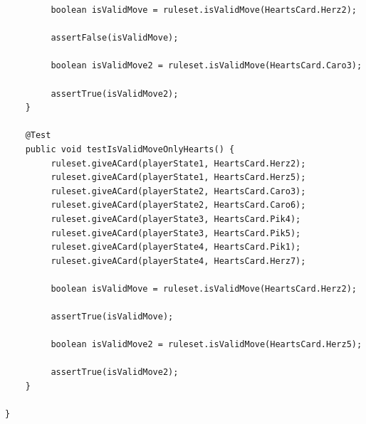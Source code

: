 \documentclass[twoside]{article}
\begin{document}
\begin{lstlisting}
	     boolean isValidMove = ruleset.isValidMove(HeartsCard.Herz2);

	     assertFalse(isValidMove);

	     boolean isValidMove2 = ruleset.isValidMove(HeartsCard.Caro3);
	     
	     assertTrue(isValidMove2);
	}
	
	@Test
	public void testIsValidMoveOnlyHearts() {
		 ruleset.giveACard(playerState1, HeartsCard.Herz2);
	     ruleset.giveACard(playerState1, HeartsCard.Herz5);
	     ruleset.giveACard(playerState2, HeartsCard.Caro3);
	     ruleset.giveACard(playerState2, HeartsCard.Caro6);
	     ruleset.giveACard(playerState3, HeartsCard.Pik4);
	     ruleset.giveACard(playerState3, HeartsCard.Pik5);
         ruleset.giveACard(playerState4, HeartsCard.Pik1);
	     ruleset.giveACard(playerState4, HeartsCard.Herz7);
	     
	     boolean isValidMove = ruleset.isValidMove(HeartsCard.Herz2);

	     assertTrue(isValidMove);

	     boolean isValidMove2 = ruleset.isValidMove(HeartsCard.Herz5);
	     
	     assertTrue(isValidMove2);
	}

}
\end{lstlisting}
\end{document}
